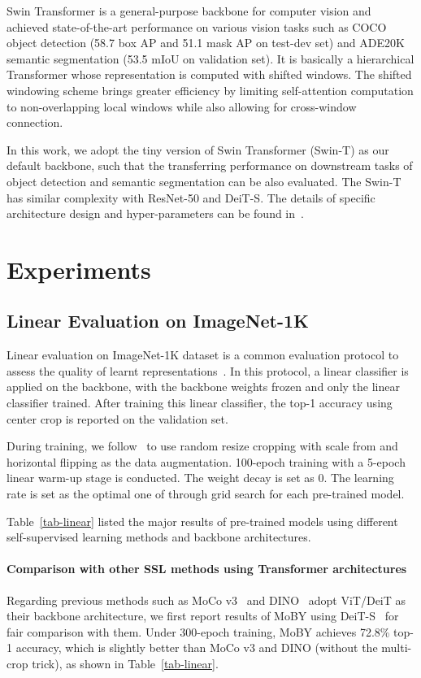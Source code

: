 \documentclass{article}
\begin{document}
Swin Transformer is a general-purpose backbone for computer vision and achieved state-of-the-art performance on various vision tasks such as COCO object detection (58.7 box AP and 51.1 mask AP on test-dev set) and ADE20K semantic segmentation (53.5 mIoU on validation set). It is basically a hierarchical Transformer whose representation is computed with shifted windows. The shifted windowing scheme brings greater efficiency by limiting self-attention computation to non-overlapping local windows while also allowing for cross-window connection.

In this work, we adopt the tiny version of Swin Transformer (Swin-T) as our default backbone, such that the transferring performance on downstream tasks of object detection and semantic segmentation can be also evaluated. The Swin-T has similar complexity with ResNet-50 and DeiT-S. The details of specific architecture design and hyper-parameters can be found in~\citep{swin}.

\section{Experiments}

\subsection{Linear Evaluation on ImageNet-1K}
Linear evaluation on ImageNet-1K dataset is a common evaluation protocol to assess the quality of learnt representations~\citep{moco}. In this protocol, a linear classifier is applied on the backbone, with the backbone weights frozen and only the linear classifier trained. After training this linear classifier, the top-1 accuracy using center crop is reported on the validation set.

During training, we follow~\citep{moco} to use random resize cropping with scale from  and horizontal flipping as the data augmentation. 100-epoch training with a 5-epoch linear warm-up stage is conducted. The weight decay is set as 0. The learning rate is set as the optimal one of  through grid search for each pre-trained model.

Table~\ref{tab-linear} listed the major results of pre-trained models using different self-supervised learning methods and backbone architectures.

\paragraph{Comparison with other SSL methods using Transformer architectures} Regarding previous methods such as MoCo v3~\citep{mocov3} and DINO~\citep{dino} adopt ViT/DeiT as their backbone architecture, we first report results of MoBY using DeiT-S~\citep{deit} for fair comparison with them. Under 300-epoch training, MoBY achieves 72.8\% top-1 accuracy, which is slightly better than MoCo v3 and DINO (without the multi-crop trick), as shown in Table~\ref{tab-linear}. 
\end{document}
